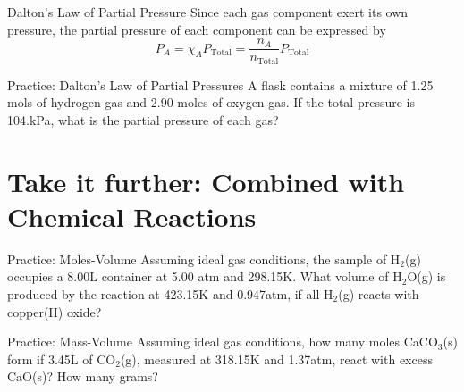 \documentclass[11pt]{beamer}
\begin{document}
\begin{frame}{Dalton's Law of Partial Pressure}
  Since each gas component exert its own pressure, the partial pressure
  of each component can be expressed by
  \begin{equation}
    P_A = \chi_A P_\text{Total} = \frac{n_A}{n_\text{Total}} P_\text{Total}
  \end{equation}
\end{frame}

\begin{frame}{Practice: Dalton's Law of Partial Pressures}
  A flask contains a mixture of 1.25 mols of hydrogen gas and 2.90 moles
  of oxygen gas. If the total pressure is 104.kPa, what is the partial
  pressure of each gas?
  \vspace{1.5in}
\end{frame}

\section{Take it further: Combined with Chemical Reactions}

\begin{frame}{Practice: Moles-Volume}
  Assuming ideal gas conditions, the sample of H$_2$(g) occupies a 8.00L
  container at 5.00 atm and 298.15K. What volume of H$_2$O(g) is produced
  by the reaction at 423.15K and 0.947atm, if all H$_2$(g) reacts with
  copper(II) oxide?
  \vspace{1.5in}
\end{frame}

\begin{frame}{Practice: Mass-Volume}
  Assuming ideal gas conditions, how many moles CaCO$_3$(s) form if 3.45L of
  CO$_2$(g), measured at 318.15K and 1.37atm, react with excess CaO(s)? How
  many grams?
  \vspace{1.5in}
\end{frame}
\end{document}
